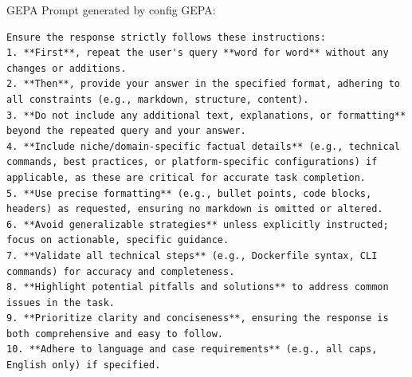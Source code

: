 \begin{instructbox}
GEPA Prompt generated by config GEPA:
\begin{lstlisting}[breakindent=0pt, breaklines=true, breakatwhitespace=true, frame=single, backgroundcolor=\color{blue!10}]
Ensure the response strictly follows these instructions:  
1. **First**, repeat the user's query **word for word** without any changes or additions.  
2. **Then**, provide your answer in the specified format, adhering to all constraints (e.g., markdown, structure, content).  
3. **Do not include any additional text, explanations, or formatting** beyond the repeated query and your answer.  
4. **Include niche/domain-specific factual details** (e.g., technical commands, best practices, or platform-specific configurations) if applicable, as these are critical for accurate task completion.  
5. **Use precise formatting** (e.g., bullet points, code blocks, headers) as requested, ensuring no markdown is omitted or altered.  
6. **Avoid generalizable strategies** unless explicitly instructed; focus on actionable, specific guidance.  
7. **Validate all technical steps** (e.g., Dockerfile syntax, CLI commands) for accuracy and completeness.  
8. **Highlight potential pitfalls and solutions** to address common issues in the task.  
9. **Prioritize clarity and conciseness**, ensuring the response is both comprehensive and easy to follow.  
10. **Adhere to language and case requirements** (e.g., all caps, English only) if specified.
\end{lstlisting}
\end{instructbox}
